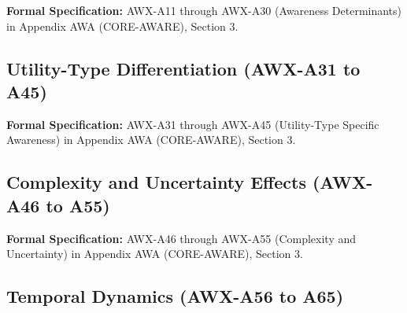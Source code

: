 

\begin{cross-reference}
\textbf{Formal Specification:} AWX-A11 through AWX-A30 (Awareness Determinants) in
Appendix AWA (CORE-AWARE), Section 3.
\end{cross-reference}

\subsection{Utility-Type Differentiation (AWX-A31 to A45)}
\label{subsec:11-8-utility-type}



\begin{cross-reference}
\textbf{Formal Specification:} AWX-A31 through AWX-A45 (Utility-Type Specific Awareness) in
Appendix AWA (CORE-AWARE), Section 3.
\end{cross-reference}

\subsection{Complexity and Uncertainty Effects (AWX-A46 to A55)}
\label{subsec:11-9-complexity}



\begin{cross-reference}
\textbf{Formal Specification:} AWX-A46 through AWX-A55 (Complexity and Uncertainty) in
Appendix AWA (CORE-AWARE), Section 3.
\end{cross-reference}

\subsection{Temporal Dynamics (AWX-A56 to A65)}
\label{subsec:11-10-temporal}



